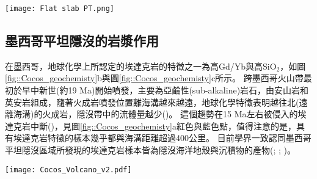\begin{figure*}[ht!]
    \centering
    \texttt{[image: Flat slab PT.png]}
    \caption[隱沒板塊頂部可能的溫壓路徑圖，摘自\citealp{Gutscher2000Bcan}]{隱沒板塊頂部可能的溫壓路徑圖，摘自\citealp{Gutscher2000Bcan}。Ec—榴輝岩(eclogite)，Am—角閃岩(amphibolite)，Ga—石榴石(garnet)，Hb—角閃石(hornblende)。
    圓形為正常隱沒帶中的溫壓路徑，菱形與正方形則為平坦隱沒的溫壓路徑。其中，灰色底部分為隱沒板塊可能的部分熔融區。
    }
    \label{fig::Flat slab PT}
\end{figure*}

\subsection{墨西哥平坦隱沒的岩漿作用}
在墨西哥，地球化學上所認定的埃達克岩的特徵之一為高Gd/Yb與高SiO$_2$，如圖\ref{fig::Cocos_geochemisty}b與圖\ref{fig::Cocos_geochemisty}c所示。
跨墨西哥火山帶最初於早中新世(約19 Ma)開始噴發，主要為亞鹼性(sub-alkaline)岩石，由安山岩和英安岩組成，隨著火成岩噴發位置離海溝越來越遠，地球化學特徵表明越往北(遠離海溝)的火成岩，隱沒帶中的流體量越少(\citealp{ferrari2012dynamic})。
這個趨勢在15 Ma左右被侵入的埃達克岩中斷(\citealp{mori2007effects})，見圖\ref{fig::Cocos_geochemisty}a紅色與藍色點，值得注意的是，具有埃達克岩特徵的樣本幾乎都與海溝距離超過400公里。
目前學界一致認同墨西哥平坦隱沒區域所發現的埃達克岩樣本皆為隱沒海洋地殼與沉積物的產物(\citealp{Gutscher2000Bcan}; \citealp{ferrari2012dynamic}; \citealp{Manea2017})。

\begin{figure*}[ht!]
    \centering
    \texttt{[image: Cocos\_Volcano\_v2.pdf]}
    \caption[墨西哥區域火山島弧地球化學分析，摘自\citealp{ferrari2012dynamic}]{墨西哥區域火山島弧地球化學分析，摘自\citealp{ferrari2012dynamic}。白點為距現今火山弧前緣小於150公里的樣本，藍色點為具現今火山弧前緣大於150公里且位在西經99-101$^{\circ}$的樣本，紅色點為具現今火山弧前緣小於150公里且位在西經96.4-99$^{\circ}$的樣本。(a)火成岩樣本年紀與現今海溝距離作圖。(b)火成岩樣本中的SiO$_2$含量與現今海溝距離作圖。(c)火成岩樣本中Gd/Yb比值與現今海溝距離作圖。(d)墨西哥中新世火山位置圖。細虛線表示到海溝的距離；粗虛線是\ref{平坦隱沒中的埃達克岩}圖例中使用的邊界。 CC：Cerro Colorado dome； CG：Cerro Grande volcan塞羅格蘭德火山； LJ： La Joya volcan拉霍亞火山； PH：Palo Huérfano 火山； PS：Palma Sola帕爾馬索拉； SA：Sierra de Angangueo塞拉利昂德安甘格奧； SM：San Martín聖馬丁； SMC：Sierra de Mil Cumbres； T-M：Tenancingo–Malinalco特南寧哥-馬利納爾科； Za：Zamorano volcano薩莫拉諾火山； Zi： Zimapán area Zimapán 地區。
    }
    \label{fig::Cocos_geochemisty}
\end{figure*}

